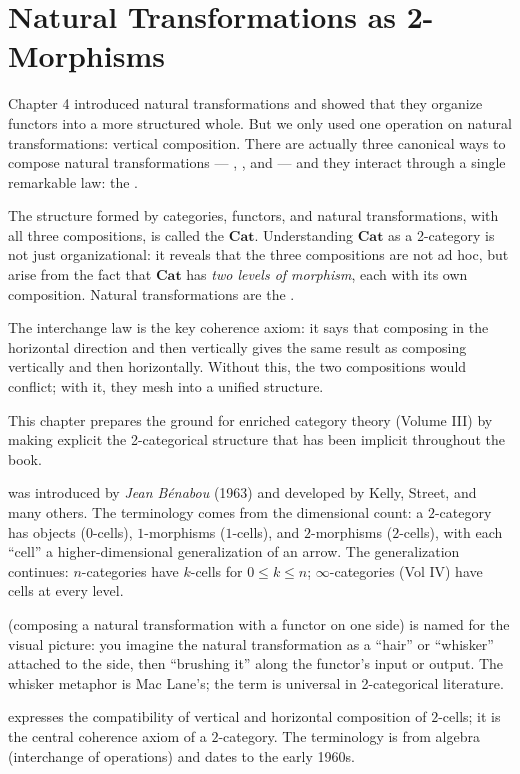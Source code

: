 
\chapter{Natural Transformations as 2-Morphisms}

\begin{overviewbox}
Chapter 4 introduced natural transformations and showed that they organize
functors into a more structured whole. But we only used one operation on
natural transformations: vertical composition. There are actually three
canonical ways to compose natural transformations --- ,
, and  --- and they interact through a
single remarkable law: the .

The structure formed by categories, functors, and natural transformations,
with all three compositions, is called the  $\mathbf{Cat}$.
Understanding $\mathbf{Cat}$ as a 2-category is not just organizational:
it reveals that the three compositions are not ad hoc, but arise from the
fact that $\mathbf{Cat}$ has \emph{two levels of morphism}, each with its
own composition. Natural transformations are the .

The interchange law is the key coherence axiom: it says that composing in
the horizontal direction and then vertically gives the same result as
composing vertically and then horizontally. Without this, the two
compositions would conflict; with it, they mesh into a unified structure.

This chapter prepares the ground for enriched category theory (Volume III)
by making explicit the 2-categorical structure that has been implicit
throughout the book.
\end{overviewbox}


\begin{nameorigin}
 was introduced by \emph{Jean Bénabou} (1963) and
developed by Kelly, Street, and many others. The terminology comes
from the dimensional count: a $2$-category has objects ($0$-cells),
$1$-morphisms ($1$-cells), and $2$-morphisms ($2$-cells), with each
``cell'' a higher-dimensional generalization of an arrow. The
generalization continues: $n$-categories have $k$-cells for $0 \leq k
\leq n$; $\infty$-categories (Vol IV) have cells at every level.

 (composing a natural transformation with a functor on
one side) is named for the visual picture: you imagine the natural
transformation as a ``hair'' or ``whisker'' attached to the side, then
``brushing it'' along the functor's input or output. The whisker
metaphor is Mac Lane's; the term is universal in 2-categorical
literature.

 expresses the compatibility of vertical and
horizontal composition of $2$-cells; it is the central coherence axiom
of a $2$-category. The terminology is from algebra (interchange of
operations) and dates to the early 1960s.
\end{nameorigin}

